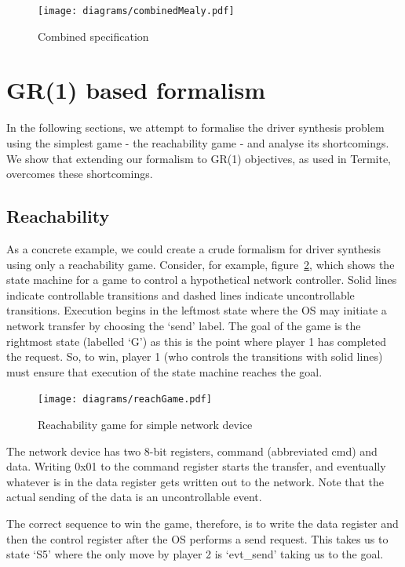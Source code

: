 \begin{figure}
\centering
\texttt{[image: diagrams/combinedMealy.pdf]}
\caption{Combined specification}
\label{fig:combined_spec_mealy}
\end{figure}

\section{GR(1) based formalism}

In the following sections, we attempt to formalise the driver synthesis problem using the simplest game - the reachability game - and analyse its shortcomings. We show that extending our formalism to GR(1) objectives, as used in Termite, overcomes these shortcomings.

\subsection{Reachability}

As a concrete example, we could create a crude formalism for driver synthesis using only a reachability game. Consider, for example, figure~\ref{fig:reach}, which shows the state machine for a game to control a hypothetical network controller. Solid lines indicate controllable transitions and dashed lines indicate uncontrollable transitions. Execution begins in the leftmost state where the OS may initiate a network transfer by choosing the `send' label. The goal of the game is the rightmost state (labelled `G') as this is the point where player 1 has completed the request. So, to win, player 1 (who controls the transitions with solid lines) must ensure that execution of the state machine reaches the goal. 

\begin{figure}
\centering
\texttt{[image: diagrams/reachGame.pdf]}
\caption{Reachability game for simple network device}
\label{fig:reach}
\end{figure}

The network device has two 8-bit registers, command (abbreviated cmd) and data. Writing 0x01 to the command register starts the transfer, and eventually whatever is in the data register gets written out to the network. Note that the actual sending of the data is an uncontrollable event. 

The correct sequence to win the game, therefore, is to write the data register and then the control register after the OS performs a send request. This takes us to state `S5' where the only move by player 2 is `evt\_send' taking us to the goal. 

